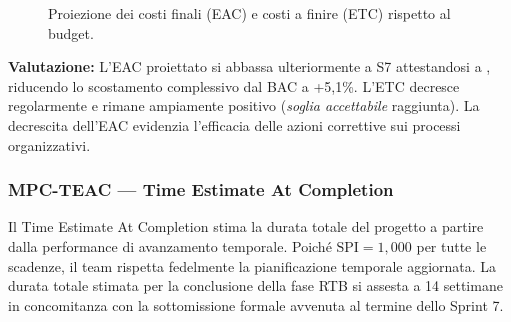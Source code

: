 \documentclass[a4paper,12pt]{article}
\providecommand{\glslink}[2]{\href{https://alittlebyte-19.github.io/Documentazione/glossario.html\#gls-#1}{\underline{#2}\textsuperscript{\scriptsize G}}}
\begin{document}
\begin{figure}[H]
\centering
{}
\caption{Proiezione dei costi finali (EAC) e costi a finire (ETC) rispetto al budget.}
\end{figure}

\noindent\textbf{Valutazione:} L'EAC proiettato si abbassa ulteriormente a S7 attestandosi a , riducendo lo scostamento complessivo dal BAC a +5,1\%. L'ETC decresce regolarmente e rimane ampiamente positivo (\emph{soglia accettabile} raggiunta). La decrescita dell'EAC evidenzia l'efficacia delle azioni correttive sui processi organizzativi.

\subsubsection{MPC-TEAC — Time Estimate At Completion}

Il Time Estimate At Completion stima la durata totale del progetto a partire dalla performance di avanzamento temporale. Poiché $\text{SPI} = 1{,}000$ per tutte le scadenze, il team rispetta fedelmente la pianificazione temporale aggiornata. La durata totale stimata per la conclusione della fase RTB si assesta a 14 settimane in concomitanza con la sottomissione formale avvenuta al termine dello Sprint 7.
\end{document}
